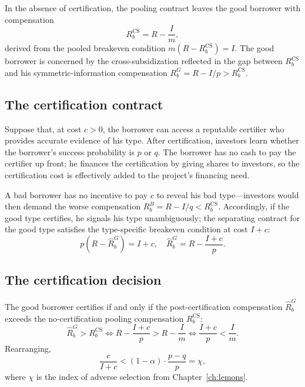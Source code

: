 \documentclass[11pt,a4paper,oneside]{book}
\theoremstyle{plain}
\theoremstyle{definition}
\theoremstyle{remark}
\numberwithin{equation}{chapter}
\begin{document}
In the absence of certification, the pooling contract leaves the good borrower with compensation
\begin{equation}\label{eq:diss-cert-no-cert}
  R_b^{\text{CS}} = R - \frac{I}{m},
\end{equation}
derived from the pooled breakeven condition $m(R - R_b^{\text{CS}}) = I$.
The good borrower is concerned by the cross-subsidization reflected in the gap between $R_b^{\text{CS}}$ and his symmetric-information compensation $R_b^{G} = R - I/p > R_b^{\text{CS}}$.

\subsection{The certification contract}

Suppose that, at cost $c > 0$, the borrower can access a reputable certifier who provides accurate evidence of his type.
After certification, investors learn whether the borrower's success probability is $p$ or $q$.
The borrower has no cash to pay the certifier up front; he finances the certification by giving shares to investors, so the certification cost is effectively added to the project's financing need.

A bad borrower has no incentive to pay $c$ to reveal his bad type---investors would then demand the worse compensation $R_b^{B} = R - I/q < R_b^{\text{CS}}$.
Accordingly, if the good type certifies, he signals his type unambiguously; the separating contract for the good type satisfies the type-specific breakeven condition at cost $I + c$:
\begin{equation}\label{eq:diss-cert-contract}
  p(R - \widehat{R}_b^{G}) = I + c,
  \quad
  \widehat{R}_b^{G} = R - \frac{I + c}{p}.
\end{equation}

\subsection{The certification decision}

The good borrower certifies if and only if the post-certification compensation $\widehat{R}_b^{G}$ exceeds the no-certification pooling compensation $R_b^{\text{CS}}$:
\begin{equation*}
  \widehat{R}_b^{G} > R_b^{\text{CS}}
  \Longleftrightarrow
  R - \frac{I + c}{p} > R - \frac{I}{m}
  \Longleftrightarrow
  \frac{I + c}{p} < \frac{I}{m}.
\end{equation*}
Rearranging,
\begin{equation}\label{eq:diss-cert-decision}
  \frac{c}{I + c} < (1 - \alpha) \cdot \frac{p - q}{p} = \chi,
\end{equation}
where $\chi$ is the index of adverse selection from Chapter~\ref{ch:lemons}.
\end{document}
